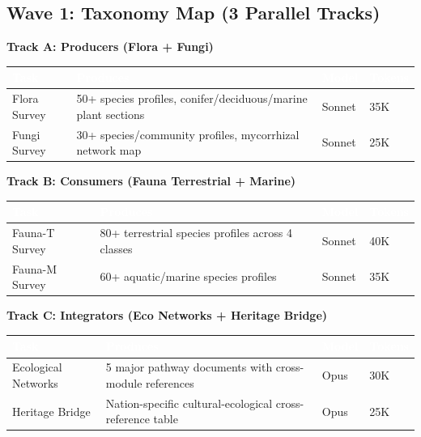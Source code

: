 \documentclass[11pt,letterpaper]{article}
\newcommand{\tableheader}[1]{\textbf{\sffamily\textcolor{white}{#1}}}
\begin{document}
\subsection{Wave 1: Taxonomy Map (3 Parallel Tracks)}

\textbf{Track A: Producers (Flora + Fungi)}

\begin{center}
\begin{tabularx}{\textwidth}{L{2.5cm}XC{1.5cm}C{1.5cm}}
\toprule
{}
\tableheader{Task} & \tableheader{Produces} & \tableheader{Model} & \tableheader{Tokens} \\
\midrule
Flora Survey & 50+ species profiles, conifer/deciduous/marine plant sections & Sonnet & 35K \\
Fungi Survey & 30+ species/community profiles, mycorrhizal network map & Sonnet & 25K \\
\bottomrule
\end{tabularx}
\end{center}

\textbf{Track B: Consumers (Fauna Terrestrial + Marine)}

\begin{center}
\begin{tabularx}{\textwidth}{L{2.5cm}XC{1.5cm}C{1.5cm}}
\toprule
{}
\tableheader{Task} & \tableheader{Produces} & \tableheader{Model} & \tableheader{Tokens} \\
\midrule
Fauna-T Survey & 80+ terrestrial species profiles across 4 classes & Sonnet & 40K \\
Fauna-M Survey & 60+ aquatic/marine species profiles & Sonnet & 35K \\
\bottomrule
\end{tabularx}
\end{center}

\textbf{Track C: Integrators (Eco Networks + Heritage Bridge)}

\begin{center}
\begin{tabularx}{\textwidth}{L{2.5cm}XC{1.5cm}C{1.5cm}}
\toprule
{}
\tableheader{Task} & \tableheader{Produces} & \tableheader{Model} & \tableheader{Tokens} \\
\midrule
Ecological Networks & 5 major pathway documents with cross-module references & Opus & 30K \\
Heritage Bridge & Nation-specific cultural-ecological cross-reference table & Opus & 25K \\
\bottomrule
\end{tabularx}
\end{center}
\end{document}
